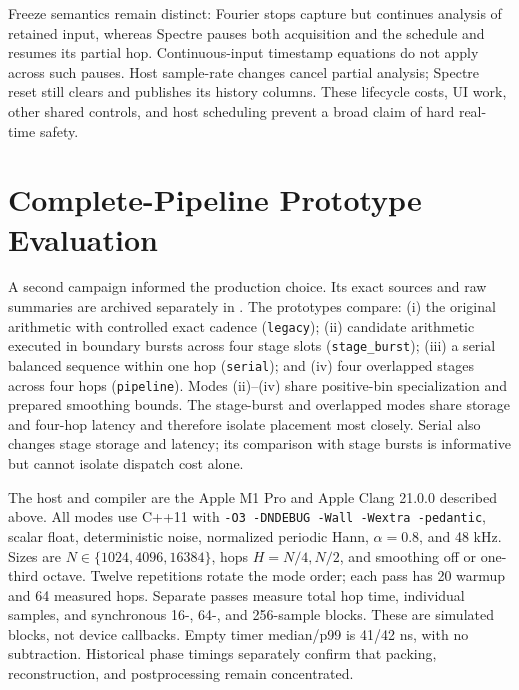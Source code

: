 \documentclass[11pt,letterpaper]{article}
\newcommand{\code}[1]{\texttt{#1}}
\begin{document}
Freeze semantics remain distinct: Fourier stops capture but continues analysis
of retained input, whereas Spectre pauses both acquisition and the schedule and
resumes its partial hop. Continuous-input timestamp equations do not apply
across such pauses. Host sample-rate changes cancel partial analysis; Spectre
reset still clears and publishes its history columns. These lifecycle costs,
UI work, other shared controls, and host scheduling prevent a broad claim of
hard real-time safety.

\section{Complete-Pipeline Prototype Evaluation}
\label{sec:pipeline-evaluation}
A second campaign informed the production choice. Its exact sources and raw
summaries are archived separately in . The
prototypes compare: (i) the original arithmetic with controlled exact cadence
(\code{legacy}); (ii) candidate arithmetic executed in boundary bursts across four stage slots
(\code{stage\_burst}); (iii) a serial balanced sequence within one hop
(\code{serial}); and (iv) four overlapped stages across four hops
(\code{pipeline}). Modes (ii)--(iv) share positive-bin specialization and
prepared smoothing bounds. The stage-burst and overlapped modes share storage and four-hop latency and
therefore isolate placement most closely. Serial also changes stage storage
and latency; its comparison with stage bursts is informative but cannot
isolate dispatch cost alone.

The host and compiler are the Apple M1 Pro and Apple Clang 21.0.0 described
above. All modes use C++11 with \code{-O3 -DNDEBUG -Wall -Wextra -pedantic},
scalar float, deterministic noise, normalized periodic Hann, $\alpha=0.8$,
and 48 kHz. Sizes are $N\in\{1024,4096,16384\}$, hops $H=N/4,N/2$, and
smoothing off or one-third octave. Twelve repetitions rotate the mode order;
each pass has 20 warmup and 64 measured hops. Separate passes measure total
hop time, individual samples, and synchronous 16-, 64-, and 256-sample blocks.
These are simulated blocks, not device callbacks. Empty timer median/p99 is
41/42 ns, with no subtraction. Historical phase timings separately confirm
that packing, reconstruction, and postprocessing remain concentrated.
\end{document}
